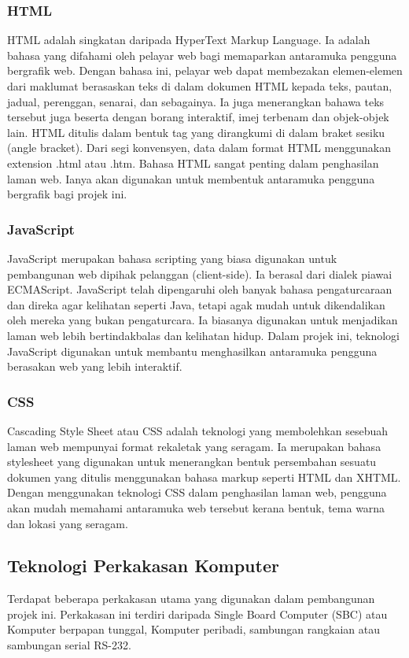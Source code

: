 \subsubsection{HTML}
HTML adalah singkatan daripada HyperText Markup Language. Ia adalah bahasa yang difahami oleh pelayar web bagi memaparkan antaramuka pengguna bergrafik web. Dengan bahasa ini, pelayar web dapat membezakan elemen-elemen dari maklumat berasaskan teks di dalam dokumen \ac{HTML} kepada teks, pautan, jadual, perenggan, senarai, dan sebagainya. Ia juga menerangkan bahawa teks tersebut juga beserta dengan borang interaktif, imej terbenam dan objek-objek lain. \ac{HTML} ditulis dalam bentuk tag yang dirangkumi di dalam braket sesiku (angle bracket). Dari segi konvensyen, data dalam format \ac{HTML} menggunakan extension .html atau .htm. Bahasa \ac{HTML} sangat penting dalam penghasilan laman web. Ianya akan digunakan untuk membentuk antaramuka pengguna bergrafik bagi projek ini.

\subsubsection{JavaScript}
JavaScript merupakan bahasa scripting yang biasa digunakan untuk pembangunan web dipihak pelanggan (client-side). Ia berasal dari dialek piawai ECMAScript. JavaScript telah dipengaruhi oleh banyak bahasa pengaturcaraan dan direka agar kelihatan seperti Java, tetapi agak mudah untuk dikendalikan oleh mereka yang bukan pengaturcara. Ia biasanya digunakan untuk menjadikan laman web lebih bertindakbalas dan kelihatan hidup. Dalam projek ini, teknologi JavaScript digunakan untuk membantu menghasilkan antaramuka pengguna berasakan web yang lebih interaktif.

\subsubsection{CSS}
Cascading Style Sheet atau CSS adalah teknologi yang membolehkan sesebuah laman web mempunyai format rekaletak yang seragam. Ia merupakan bahasa stylesheet yang digunakan untuk menerangkan bentuk persembahan sesuatu dokumen yang ditulis menggunakan bahasa markup seperti \ac{HTML} dan XHTML. Dengan menggunakan teknologi CSS dalam penghasilan laman web, pengguna akan mudah memahami antaramuka web tersebut kerana bentuk, tema warna dan lokasi yang seragam.

\subsection{Teknologi Perkakasan Komputer}
Terdapat beberapa perkakasan utama yang digunakan dalam pembangunan projek ini. Perkakasan ini terdiri daripada Single Board Computer (SBC) atau Komputer berpapan tunggal, Komputer peribadi, sambungan rangkaian atau sambungan serial RS-232.

